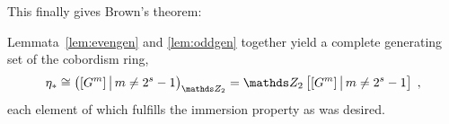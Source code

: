 This finally gives Brown's theorem:
\begin{Thm}
  Lemmata~\ref{lem:evengen} and \ref{lem:oddgen} together yield a
  complete generating set of the cobordism ring, \idest
  \begin{gather*}
    \c_*\cong \left( [\G m] \,\big|\, m\neq 2^s-1 \right)_{\Zmod2}
    = \Zmod2\left[[\G m] \,\big|\, m\neq 2^s-1\right]
    \;,
  \end{gather*}
  each element of which fulfills the immersion property as was
  desired.
\end{Thm}


